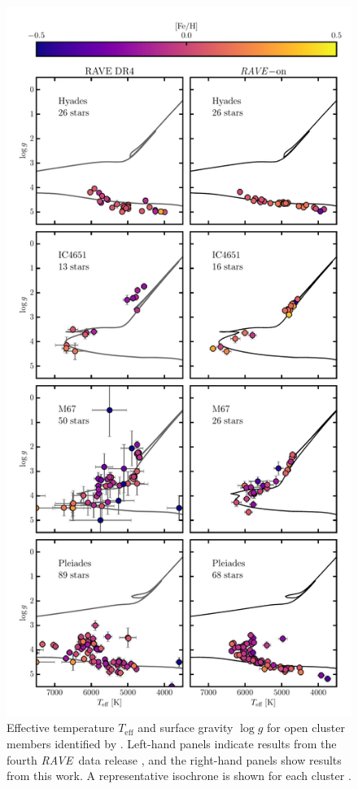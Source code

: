 \documentclass[preprint]{aastex61}
\newcommand{\acronym}[1]{{\small{#1}}}
\newcommand{\project}[1]{\textsl{#1}}
\newcommand{\rave}{\project{\acronym{RAVE}}}
\newcommand{\teff}{T_{\mathrm{eff}}}
\newcommand{\logg}{\log g}
\begin{document}
\begin{figure}[p]
\center
\includegraphics[height=\textheight]{figures/open-clusters.pdf}
\caption{Effective temperature $\teff$ and surface gravity $\logg$ for open cluster members identified by \citep{Kunder_2016}.  Left-hand panels indicate results from the fourth \rave\ data release \citep{Kordopatis_2013}, and the right-hand panels show results from this work.  A representative isochrone is shown for each cluster \citep{Bressan_2012}.\label{fig:open-cluster-HRD}}
\end{figure}
\end{document}
